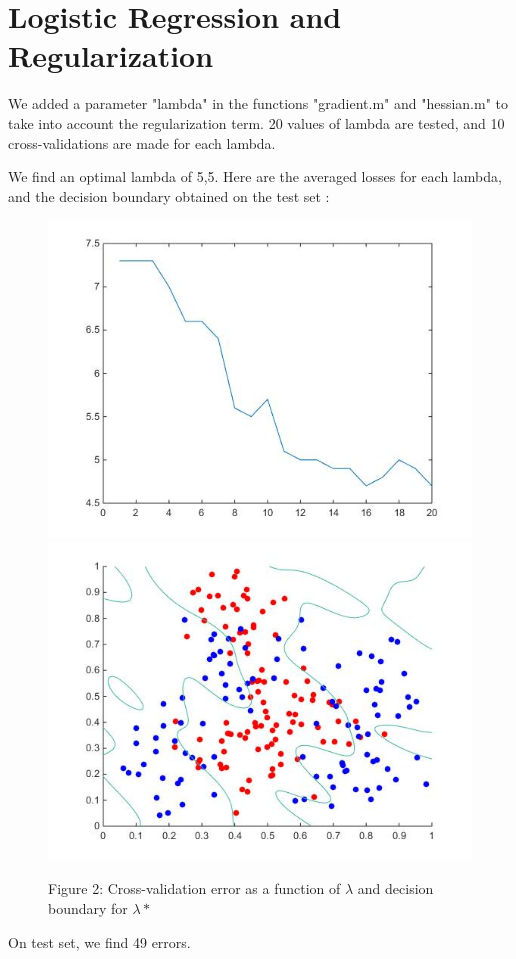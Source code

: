 \documentclass[a4paper, 12pt]{article}
\begin{document}
\section{Logistic Regression and Regularization}

We added a parameter "lambda" in the functions "gradient.m" and "hessian.m" to take into account the regularization term. 20 values of lambda are tested,  and 10 cross-validations are made for each lambda.

We find an optimal lambda of 5,5. Here are the averaged losses for each lambda, and the decision boundary obtained on the test set :

\begin{figure}[!htbp]
\centering
\noindent\includegraphics[scale=0.4]{images/ass1-img4.jpg}
\noindent\includegraphics[scale=0.4]{images/ass1-img5.jpg}
\caption{Figure 2: Cross-validation error as a function of $\lambda$ and decision boundary for $\lambda *$}
\end{figure}

On test set, we find 49 errors.
\end{document}
